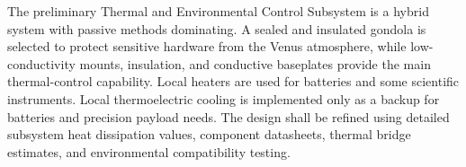 






The preliminary Thermal and Environmental Control Subsystem is a hybrid system with passive methods dominating. A sealed and insulated gondola is selected to protect sensitive hardware from the Venus atmosphere, while low-conductivity mounts, insulation, and conductive baseplates provide the main thermal-control capability. Local heaters are used for batteries and some scientific instruments. Local thermoelectric cooling is implemented only as a backup for batteries and precision payload needs. The design shall be refined using detailed subsystem heat dissipation values, component datasheets, thermal bridge estimates, and environmental compatibility testing.